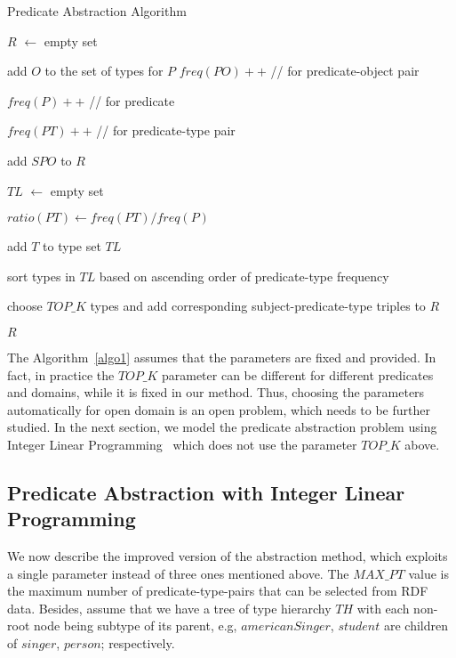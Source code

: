 \begin{algorithm}
\label{algo1}
\caption{Predicate Abstraction Algorithm}

\SetAlgoLined
{}
$R$ $\leftarrow$ empty set

 {
	 {
		add $O$ to the set of types for $P$
	}
	$freq(PO)++$  //  for predicate-object pair

	$freq(P)++$  //  for predicate
}

 {
	 {
		$freq(PT)++$  //  for predicate-type pair
	}
}

 {
	 {
		add $SPO$ to $R$
	}
}
 {

	$TL$ $\leftarrow$ empty set

	 {
		$ratio(PT) \leftarrow freq(PT) / freq(P)$

		 {
			add $T$ to type set $TL$
		}
	}
	sort types in $TL$ based on ascending order of predicate-type frequency

	choose $TOP\_K$ types and add corresponding subject-predicate-type triples to $R$

}

\Return $R$

\end{algorithm}

The Algorithm~\ref{algo1} assumes that the parameters are fixed and provided. In fact, in practice the $TOP\_K$ parameter can be different for different predicates and domains, while it is fixed in our method. Thus, choosing the parameters automatically for open domain is an open problem, which needs to be further studied. In the next section, we model the predicate abstraction problem using Integer Linear Programming~\cite{ref1} which does not use the parameter $TOP\_K$ above.

\subsection{Predicate Abstraction with Integer Linear Programming}

We now describe the improved version of the abstraction method, which exploits a single parameter instead of three ones mentioned above. The $MAX\_PT$ value is the maximum number of predicate-type-pairs that can be selected from RDF data. Besides, assume that we have a tree of type hierarchy $TH$ with each non-root node being subtype of its parent, e.g, $americanSinger$, $student$ are children of $singer$, $person$; respectively.

